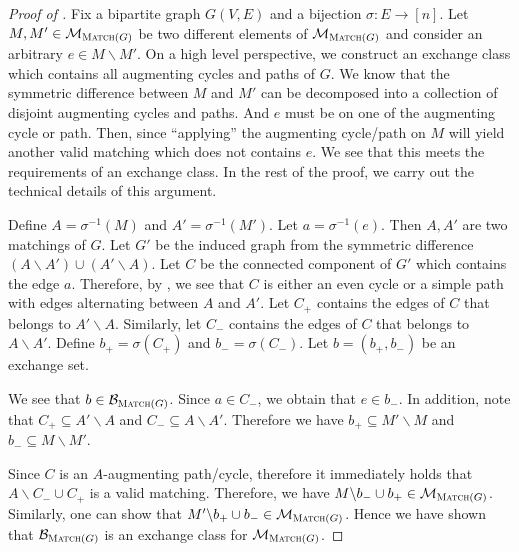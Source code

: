 \documentclass{article}
\newcommand{\junk}[1]{}
\newcommand{\M}{\mathcal M}
\newcommand{\B}{\mathcal B}
\newcommand{\del}{\backslash}
\DeclareMathOperator{\rank}{width}
\newcommand{\Match}{\textsc{Match}\xspace}
\begin{document}
\begin{proof}[Proof of ]
Fix  a bipartite graph $G(V,E)$ and a bijection $\sigma\colon E\rightarrow [n]$. 
Let $M,M' \in \M_{\Match(G)}$ be two different elements of $\M_{\Match(G)}$ and consider an arbitrary $e\in M\del M'$.
On a high level perspective, we construct an exchange class which contains all augmenting cycles and paths of $G$.
We know that the symmetric difference between $M$ and $M'$ can be decomposed into a collection of disjoint augmenting cycles and paths. 
And $e$ must be on one of the augmenting cycle or path. 
Then, since ``applying'' the augmenting cycle/path on $M$ will yield another valid matching which does not contains $e$. 
We see that this meets the requirements of an exchange class.
In the rest of the proof, we carry out the technical details of this argument.



Define $A=\sigma^{-1}(M)$ and $A'=\sigma^{-1}(M')$. 
Let $a=\sigma^{-1}(e)$.
Then $A,A'$ are two matchings of $G$. 
Let $G'$ be the induced graph from the symmetric difference $(A\del A')\cup(A'\del A)$.
Let $C$ be the connected component of $G'$ which contains the edge $a$.
Therefore, by , we see that $C$ is either an even cycle or a  simple path with edges alternating between $A$ and $A'$.
Let $C_+$ contains the edges of $C$ that belongs to $A'\del A$.
Similarly, let $C_-$ contains the edges of $C$ that belongs to $A\del A'$.
Define $b_+ = \sigma(C_+)$ and $b_-=\sigma(C_-)$.
Let $b=(b_+,b_-)$ be an exchange set.

\junk{
Now we construct the exchange class.
Let $\mathcal C$ be the set of all cycles in $G$.
Let $\mathcal P$ be the set of all paths in $G$.
We define $\B_{\Match(G)}$ to correspond to the set of all cycles and all paths of $G$ with edges alternating between $b_+$ and $b_-$.
Formally, we have
$$
\B_{\Match(G)} = \Big\{(\sigma(c_+),\sigma(c_-)) \mid \exists c\in \mathcal C\cup P,\; \text{the edges of }c\text{ alternate between } c_+,c_-\Big\}.
$$
}

We see that $b\in \B_{\Match(G)}$.
Since $a\in C_-$, we obtain that $e\in b_-$.
In addition, note that $C_+ \subseteq A'\del A$ and $C_- \subseteq A\del A'$.
Therefore we have $b_+ \subseteq M'\del M$ and $b_- \subseteq M\del M'$.

Since $C$ is an $A$-augmenting path/cycle, therefore it immediately holds that $A\del C_-\cup C_+$ is a valid matching.
Therefore, we have $M\del b_- \cup b_+ \in \M_{\Match(G)}$.
Similarly, one can show that $M'\del b_+ \cup b_-\in \M_{\Match(G)}$.
Hence we have shown that $\B_{\Match(G)}$ is an exchange class for $\M_{\Match(G)}$.
\end{proof}
\end{document}
